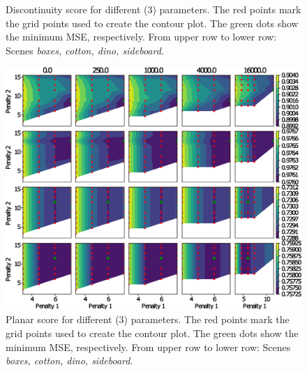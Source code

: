 \documentclass  [
  paper    = a4,
  BCOR     = 10mm,
  twoside,
  fontsize = 12pt,
  fleqn,
  toc      = bibnumbered,
  toc      = listofnumbered,
  numbers  = noendperiod,
  headings = normal,
  listof   = leveldown,
  version  = 3.03
]                                       {scrreprt}
\begin{document}
\begin{appendix}
\begin{figure}[h!]
  		\caption[Discontinuity score for different (3) parameters]{Discontinuity score for different (3) parameters. The red points mark the grid points used to create the contour plot. The green dots show the minimum MSE, respectively. From upper row to lower row: Scenes \textit{boxes, cotton, dino, sideboard}.}
  		\label{fig:sgmparamscontourdis}
  	\end{figure}
  	\begin{figure}[h!]
  		\centering
  		\includegraphics[width=1\linewidth]{images/sgm_params_contour_mae_planes}
  		\caption[Planar score for different (3) parameters]{Planar score for different (3) parameters. The red points mark the grid points used to create the contour plot. The green dots show the minimum MSE, respectively. From upper row to lower row: Scenes \textit{boxes, cotton, dino, sideboard}.}
  		\label{fig:sgmparamscontourdmae}
  	\end{figure}
%  

\end{appendix}
\end{document}
